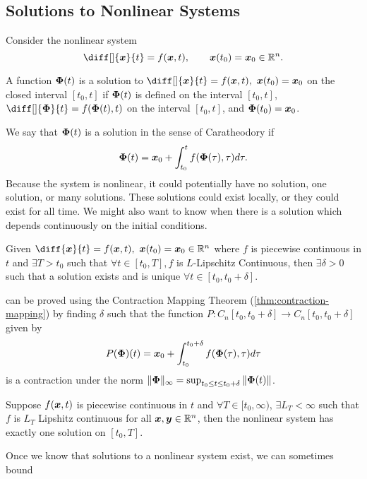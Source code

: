 \subsection{Solutions to Nonlinear Systems}
Consider the nonlinear system \[
	\diff[]{\bs{x}}{t} = f(\bs{x}, t),\qquad \bs{x}(t_0) = \bs{x}_0\in \R^n.
\]
\begin{definition}
	A function $\boldsymbol{\Phi}(t)$ is a solution to $\diff[]{\bs{x}}{t} = f(\bs{x}, t),\
	\bs{x}(t_0) = \bs{x}_0$ on the closed interval $[t_0, t]$ if $\boldsymbol{\Phi}(t)$
	is defined on the interval $[t_0, t]$, $\diff[]{\bs{\Phi}}{t} =
	f(\bs{\Phi}(t), t)$ on the interval $[t_0, t]$, and $\boldsymbol{\Phi}(t_0) =
	\boldsymbol{x}_0$.
	\label{defn:nonlinear-solution}
\end{definition}
We say that $\boldsymbol{\Phi}(t)$ is a solution in the sense of Caratheodory if \[
	\boldsymbol{\Phi}(t) = \boldsymbol{x}_0 + \int_{t_0}^t f(\boldsymbol{\Phi}(\tau), \tau)d\tau.
\]
Because the system is nonlinear, it could potentially have no solution, one
solution, or many solutions. These solutions could exist locally, or they could
exist for all time. We might also want to know when there is a solution which
depends continuously on the initial conditions.
\begin{theorem}
	Given $\diff{\bs{x}}{t} = f(\bs{x}, t),\ \bs{x}(t_0) = \bs{x}_0\in\R^n$ where
	$f$ is piecewise continuous in $t$ and $\exists T>t_0$ such that $\forall t\in
	[t_0, T], f$ is $L$-Lipschitz Continuous, then $\exists \delta > 0$ such that a
	solution exists and is unique $\forall t\in [t_0, t_0 + \delta]$.
	\label{thm:local-existence}
\end{theorem}
 can be proved using the Contraction Mapping Theorem
(\cref{thm:contraction-mapping}) by finding $\delta$ such that the function
$P:C_n[t_0, t_0+\delta] \to C_n[t_0, t_0+\delta]$ given by \[
	P(\boldsymbol{\Phi})(t) = \boldsymbol{x}_0 + \int_{t_0}^{t_0+\delta} f(\boldsymbol{\Phi}(\tau),
	\tau)d\tau
\]
is a contraction under the norm $\|\boldsymbol{\Phi}\|_\infty = \sup_{t_0\leq t \leq
t_0+\delta} \|\boldsymbol{\Phi}(t)\|$.
\begin{theorem}
	Suppose $f(\boldsymbol{x}, t)$ is piecewise continuous in $t$ and $\forall T\in [t_0,
	\infty)$, $\exists L_T < \infty$ such that $f$ is $L_T$ Lipshitz continuous
	for all $\boldsymbol{x}, \boldsymbol{y} \in \mathbb{R}^n$, then the nonlinear system  has exactly one
	solution on $[t_0, T]$.
	\label{thm:global-existence}
\end{theorem}
Once we know that solutions to a nonlinear system exist, we can sometimes bound

